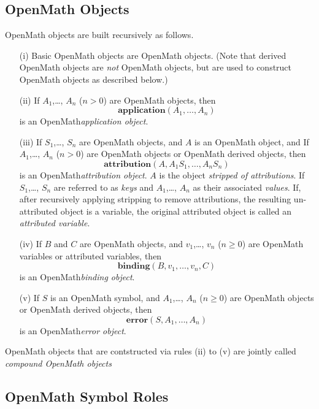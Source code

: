 \documentclass{report}
\def\OM{OpenMath\xspace}
\def\application#1{\mathbf{application}(#1)}
\def\binding#1{\mathbf{binding}(#1)}
\def\attribution#1{\mathbf{attribution}(#1)}
\def\error#1{\mathbf{error}(#1)}
\begin{document}
\subsection{\OM Objects}\label{sec_compound}
  
\OM objects are built recursively as follows.
\begin{itemize}
\item[(i)] Basic \OM objects are \OM objects.
(Note that derived \OM objects are
\emph{not} \OM objects, but are used to construct \OM
objects as described below.)
\item[(ii)] If $A_1$,\ldots, $A_n$ ($n>0$) are \OM objects, then
  \[\application{A_1,\ldots,A_n}\]
  is an \OM \emph{application object}.
\item[(iii)] If $S_1$,\ldots, $S_n$ are \OM objects, and $A$ is an \OM object, and If
  $A_1$,\ldots, $A_n$ ($n>0$) are \OM objects or \OM derived objects, then
  \[\attribution{A, A_1 S_1,\ldots,A_n S_n}\]
  is an \OM \emph{attribution object}. $A$ is the object \emph{stripped of attributions}.
  If $S_1$,\ldots, $S_n$ are referred to as \emph{keys} and $A_1$,\ldots, $A_n$ as their
  associated \emph{values}.  If, after recursively applying stripping to remove
  attributions, the resulting un-attributed object is a variable, the original attributed
  object is called an \emph{attributed variable}.

\item[(iv)] If $B$ and $C$ are \OM objects, and $v_1$,\ldots, $v_n$ ($n\geq 0$) are \OM variables or attributed
  variables, then
  \[\binding{B, v_1,\ldots,v_n, C}\]
  is an \OM \emph{binding object}.

\item[(v)]  If $S$ is an \OM symbol, and $A_1$,\ldots, $A_n$ ($n\geq 0$) are \OM objects or
\OM derived objects, then
  \[\error{S, A_1,\ldots,A_n}\]
  is an \OM \emph{error object}.
\end{itemize}
\OM objects that are contstructed via rules (ii) to (v) are jointly called \emph{compound
  \OM objects}
\subsection{\OM Symbol Roles}\label{sec_roles}
\end{document}
